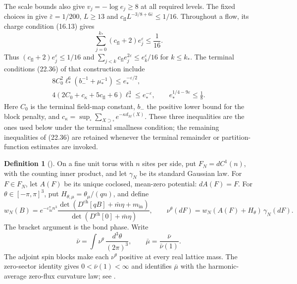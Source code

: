 \documentclass[11pt,letterpaper,reqno]{amsart}
\theoremstyle{definition}
\newtheorem{qcmdefinition}[qcmproposition]{Definition}
\newenvironment{definition}[1][]{\pushQED{\qed}\renewcommand{\qedsymbol}{$\blacksquare$}\begin{qcmdefinition}[#1]}{\popQED\end{qcmdefinition}}
\begin{document}
The scale bounds also give $v_j=-\log e_j\ge8$ at all required levels.
The fixed choices in \cite[Proposition~24.1]{QEDConstruction}
give $\bar\varepsilon=1/200$, $L\ge13$ and
$c_{\mathrm{fl}}L^{-3/8+6\bar\varepsilon}\le1/16$.
Throughout a flow, its charge condition (16.13) gives
\begin{equation}\label{qcm:rg-smallness}
 \sum_{j=0}^{k_*}(c_{\mathrm{fl}}+2)e_j^\varepsilon\le\frac1{16}.
\end{equation}
Thus $(c_{\mathrm{fl}}+2)e_j^\varepsilon\le1/16$ and
$\sum_{j<k}c_{\mathrm{fl}}e_j^{2\varepsilon}
\le e_k^\varepsilon/16$ for $k\le k_*$.
The terminal conditions (22.36) of that construction include
\begin{equation}\label{qcm:terminal-smallness}
\begin{gathered}
 8C_0^2\ell_*^6(b_-^{-1}+\mu_*^{-1})
             \le e_*^{-\varepsilon/2},\\
 4(2C_0+c_\kappa+5c_{\mathrm{fl}}+6)\ell_*^3
             \le e_*^{-\varepsilon},\qquad
 e_*^{1/4-9\varepsilon}\le\frac18.
\end{gathered}
\end{equation}
Here $C_0$ is the terminal field-map constant,
$b_-$ the positive lower bound for the block penalty, and
$c_\kappa=\sup_\square\sum_{X\supset\square}e^{-\kappa d_M(X)}$.
These three inequalities are the ones used below under the
terminal smallness condition; the remaining inequalities of
(22.36) are retained whenever the terminal remainder or
partition-function estimates are invoked.

\begin{definition}\label{qcm:zero-flux-law}
On a fine unit torus with $n$ sites per side, put
$F_N=dC^1(n)$, with the counting inner product, and let
$\gamma_N$ be its standard Gaussian law.
For $F\in F_N$, let $A(F)$ be its unique coclosed,
mean-zero potential: $dA(F)=F$.
For $\theta\in[-\pi,\pi]^3$, put
$H_{\theta,\mu}=\theta_\mu/(qn)$, and define
\[
 w_N(B)=e^{-\varepsilon_{\mathrm{in}}^{\mathrm v}n^3}
 \frac{\det(D^{\mathrm{ch}}[qB]+\bar m\eta+m_{\mathrm{in}})}
      {\det(D^{\mathrm{ch}}[0]+\bar m\eta)},\qquad
 \nu^\theta(dF)=w_N(A(F)+H_\theta)\,\gamma_N(dF).
\]
The bracket argument is the bond phase. Write
\[
 \bar\nu=\int\nu^\theta\,\frac{d^3\theta}{(2\pi)^3},
 \qquad \bar\mu=\frac{\bar\nu}{\bar\nu(1)}.
\]
The adjoint spin blocks make each $\nu^\theta$ positive at every
real lattice mass. The zero-sector identity gives
$0<\bar\nu(1)<\infty$ and identifies $\bar\mu$ with the
harmonic-average zero-flux curvature law; see
\cite[Section~22.2 and Proposition~21.2]{QEDConstruction}.
\end{definition}
\end{document}
